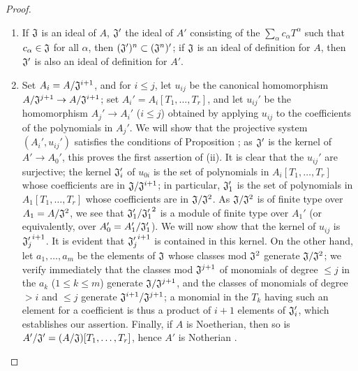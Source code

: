 \begin{proof}
\label{proof-0.7.5.4}
\medskip\noindent
\begin{enumerate}[label=(\roman*)]
  \item If $\mathfrak{J}$ is an ideal of $A$, $\mathfrak{J}'$ the ideal of $A'$
    consisting of the $\sum_\alpha c_\alpha T^\alpha$ such that $c_\alpha\in\mathfrak{J}$
    for all $\alpha$, then $(\mathfrak{J}')^n\subset(\mathfrak{J}^n)'$; if $\mathfrak{J}$
    is an ideal of definition for $A$, then $\mathfrak{J}'$ is also an ideal of definition
    for $A'$.
  \item Set $A_i=A/\mathfrak{J}^{i+1}$, and for $i\leqslant j$, let $u_{ij}$ be the
    canonical homomorphism $A/\mathfrak{J}^{j+1}\to A/\mathfrak{J}^{i+1}$; set
    $A_i'=A_i[T_1,\dots,T_r]$, and let $u_{ij}'$ be the homomorphism $A_j'\to A_i'$
    ($i\leqslant j$) obtained by applying $u_{ij}$ to the coefficients of the polynomials
    in $A_j'$. We will show that the projective system $(A_i',u_{ij}')$ satisfies the conditions
    of Proposition ; as $\mathfrak{J}'$ is the kernel of
    $A'\to A_0'$, this proves the first assertion of (ii). It is clear that the $u_{ij}'$ are
    surjective; the kernel $\mathfrak{J}_i'$ of $u_{0i}$ is the set of polynomials in
    $A_i[T_1,\dots,T_r]$ whose coefficients are in $\mathfrak{J}/\mathfrak{J}^{i+1}$; in
    particular, $\mathfrak{J}_1'$ is the set of polynomials in $A_1[T_1,\dots,T_r]$ whose
    coefficients are in $\mathfrak{J}/\mathfrak{J}^2$. As $\mathfrak{J}/\mathfrak{J}^2$ is
    of finite type over $A_1=A/\mathfrak{J}^2$, we see that $\mathfrak{J}_1'/{\mathfrak{J}_1'}^2$
    is a module of finite type over $A_1'$ (or equivalently, over $A_0'=A_1'/\mathfrak{J}_1'$).
    We will now show that the kernel of $u_{ij}$ is ${\mathfrak{J}_j'}^{i+1}$. It is evident that
    ${\mathfrak{J}_j'}^{i+1}$ is contained in this kernel. On the other hand, let $a_1,\dots,a_m$
    be the elements of $\mathfrak{J}$ whose classes mod $\mathfrak{J}^2$ generate
    $\mathfrak{J}/\mathfrak{J}^2$; we verify immediately that the classes mod $\mathfrak{J}^{j+1}$
    of monomials of degree $\leqslant j$ in the $a_k$ ($1\leqslant k\leqslant m$) generate
    $\mathfrak{J}/\mathfrak{J}^{j+1}$, and the classes of monomials of degree $>i$ and
    $\leqslant j$ generate $\mathfrak{J}^{i+1}/\mathfrak{J}^{j+1}$; a monomial in the $T_k$
    having such an element for a coefficient is thus a product of $i+1$ elements of
    $\mathfrak{J}_i'$, which establishes our assertion. Finally, if $A$ is Noetherian, then so
    is $A'/\mathfrak{J}'=(A/\mathfrak{J})[T_1,\dots,T_r]$, hence $A'$ is Notherian .
\end{enumerate}
\end{proof}

